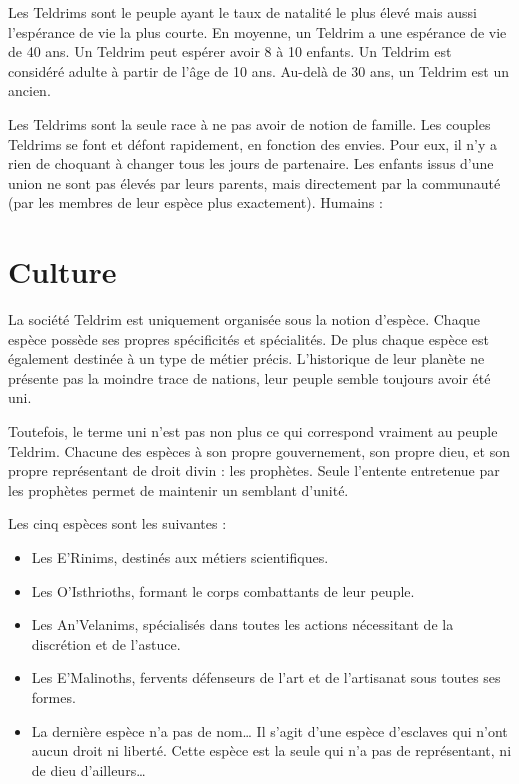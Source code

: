 \begin{multicols}{2}
Les Teldrims sont le peuple ayant le taux de natalité le plus élevé mais aussi l'espérance de vie la plus courte. En moyenne, un Teldrim a une espérance de vie de 40 ans. Un Teldrim peut espérer avoir 8 à 10 enfants. Un Teldrim est considéré adulte à partir de l'âge de 10 ans. Au-delà de 30 ans, un Teldrim est un ancien. 

Les Teldrims sont la seule race à ne pas avoir de notion de famille. Les couples Teldrims se font et défont rapidement, en fonction des envies. Pour eux, il n'y a rien de choquant à changer tous les jours de partenaire. Les enfants issus d'une union ne sont pas élevés par leurs parents, mais directement par la communauté (par les membres de leur espèce plus exactement). Humains : 

\section{Culture}

La société Teldrim est uniquement organisée sous la notion d'espèce. Chaque espèce possède ses propres spécificités et spécialités. De plus chaque espèce est également destinée à un type de métier précis. L'historique de leur planète ne présente pas la moindre trace de nations, leur peuple semble toujours avoir été uni. 

Toutefois, le terme uni n'est pas non plus ce qui correspond vraiment au peuple Teldrim. Chacune des espèces à son propre gouvernement, son propre dieu, et son propre représentant de droit divin : les prophètes. Seule l'entente entretenue par les prophètes permet de maintenir un semblant d'unité.

Les cinq espèces sont les suivantes :
\begin{itemize}
	\item Les E'Rinims, destinés aux métiers scientifiques.
	\item Les O'Isthrioths, formant le corps combattants de leur peuple.
	\item Les An'Velanims, spécialisés dans toutes les actions nécessitant de la discrétion et de l'astuce.
	\item Les E'Malinoths, fervents défenseurs de l'art et de l'artisanat sous toutes ses formes.
	\item La dernière espèce n'a pas de nom… Il s'agit d'une espèce d'esclaves qui n'ont aucun droit ni liberté. Cette espèce est la seule qui n'a pas de représentant, ni de dieu d'ailleurs…
\end{itemize}


\end{multicols}
